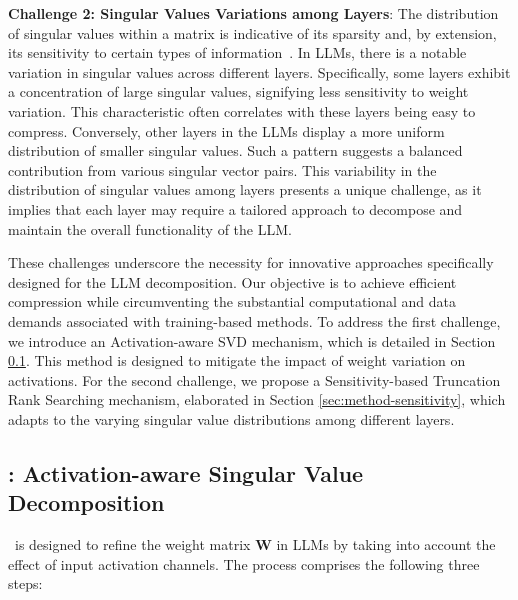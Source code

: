 \textbf{Challenge 2: Singular Values Variations among Layers}: 
The distribution of singular values within a matrix is indicative of its sparsity and, by extension, its sensitivity to certain types of information~\citep{kim2015compression,kim2019efficient,wen2017coordinating}. In LLMs, there is a notable variation in singular values across different layers. 
Specifically, some layers exhibit a concentration of large singular values, signifying less sensitivity to weight variation. This characteristic often correlates with these layers being easy to compress. Conversely, other layers in the LLMs display a more uniform distribution of smaller singular values. Such a pattern suggests a balanced contribution from various singular vector pairs. This variability in the distribution of singular values among layers presents a unique challenge, as it implies that each layer may require a tailored approach to decompose and maintain the overall functionality of the LLM. 

These challenges underscore the necessity for innovative approaches specifically designed for the LLM decomposition. Our objective is to achieve efficient compression while circumventing the substantial computational and data demands associated with training-based methods. 
To address the first challenge, we introduce an Activation-aware SVD mechanism, which is detailed in Section \ref{sec:method-activation}. This method is designed to mitigate the impact of weight variation on activations. For the second challenge, we propose a Sensitivity-based Truncation Rank Searching mechanism, elaborated in Section \ref{sec:method-sensitivity}, which adapts to the varying singular value distributions among different layers. 


\subsection{\asvd: Activation-aware Singular Value Decomposition}
\label{sec:method-activation}

\asvd~is designed to refine the weight matrix $\mathbf{W}$ in LLMs by taking into account the effect of input activation channels. The process comprises the following three steps:

